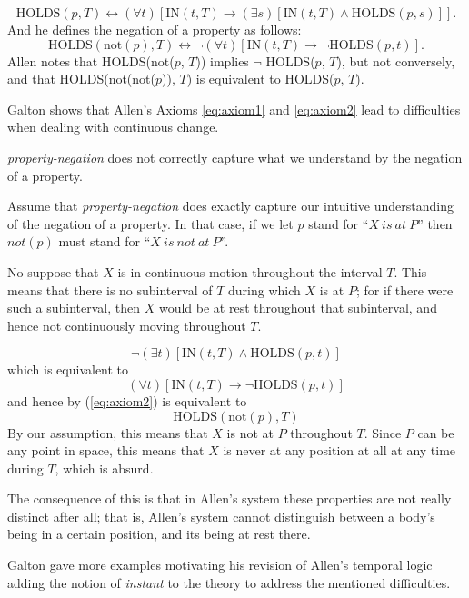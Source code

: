\begin{equation}
	\text{HOLDS}(p, T) \leftrightarrow (\forall t) [\text{IN}(t, T) \to (\exists s)[\text{IN}(t, T) \land \text{HOLDS}(p, s)]].
	\label{eq:axiom1}
\end{equation}
And he defines the negation of a property as follows:
\begin{equation}
	\text{HOLDS}(\text{not}(p), T) \leftrightarrow \neg (\forall t) [\text{IN}(t, T) \to \neg \text{HOLDS}(p, t)].
	\label{eq:axiom2}
\end{equation}
Allen notes that HOLDS(not($p$, $T$)) implies $\neg$ HOLDS($p$, $T$), but not conversely, and that HOLDS(not(not($p$)), $T$) is equivalent to HOLDS($p$, $T$).

Galton shows that Allen's Axioms \ref{eq:axiom1} and \ref{eq:axiom2} lead to difficulties when dealing with continuous change.

\begin{exmp} \textit{property-negation} does not correctly capture what we understand by the negation of a property.

	Assume that \textit{property-negation} does exactly capture our intuitive understanding of the negation of a property. In that case, if we let $p$ stand for ``$X \  is \  at \ P$''
	then $not(p)$ must stand for ``$X \  is \  not \  at \ P$''.

	No suppose that $X$ is in continuous motion throughout the interval $T$. This means that there is no subinterval of $T$ during which $X$ is at $P$;
	for if there were such a subinterval, then $X$ would be at rest throughout that subinterval, and hence not continuously moving throughout $T$.

	\begin{equation}
		\neg (\exists t)[\text{IN}(t, T) \land \text{HOLDS}(p, t)]
	\end{equation}
	which is equivalent to
	\begin{equation}
		(\forall t)[\text{IN}(t, T) \to \neg \text{HOLDS}(p, t)]
	\end{equation}
	and hence by (\ref{eq:axiom2}) is equivalent to
	\begin{equation}
		\text{HOLDS}(\text{not}(p), T)
	\end{equation}
	By our assumption, this means that $X$ is not at $P$ throughout $T$. Since $P$ can be any point in space, this means that $X$ is never at any position at all at any time during $T$, which is absurd.

	The consequence of this is that in Allen's system these properties are not really distinct after all; that is, Allen's system cannot distinguish between a body's being in a certain position, and its being at rest there.
\end{exmp}

Galton gave more examples motivating his revision of Allen's temporal logic adding the notion of \textit{instant} to the theory to address the mentioned difficulties.
